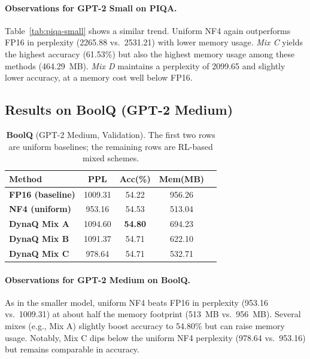 \documentclass{article}
\begin{document}
	\paragraph{Observations for GPT-2 Small on PIQA.}
	Table~\ref{tab:piqa-small} shows a similar trend. Uniform NF4 again outperforms FP16 in perplexity (2265.88 vs.\ 2531.21) with lower memory usage. \emph{Mix C} yields the highest accuracy (61.53\%) but also the highest memory usage among these methods (464.29~MB). \emph{Mix D} maintains a perplexity of 2099.65 and slightly lower accuracy, at a memory cost well below FP16.
	
	\subsection{Results on BoolQ (GPT-2 Medium)}
	\label{sec:boolq-medium}
	
	\begin{table}[ht]
		\centering
		\caption{\small \textbf{BoolQ} (GPT-2 Medium, Validation). The first two rows are uniform baselines; the remaining rows are RL-based mixed schemes.}
		\label{tab:boolq-medium}
		\begin{tabular}{lcccc}
			\toprule
			\textbf{Method} & \textbf{PPL} & \textbf{Acc(\%)} & \textbf{Mem(MB)} \\
			\midrule
			\textbf{FP16 (baseline)}  & 1009.31 & 54.22 & 956.26 \\
			\textbf{NF4 (uniform)}    & 953.16  & 54.53 & 513.04 \\
			\midrule
			\textbf{DynaQ Mix A}      & 1094.60 & \textbf{54.80} & 694.23 \\
			\textbf{DynaQ Mix B}      & 1091.37 & 54.71 & 622.10 \\
			\textbf{DynaQ Mix C}      & 978.64  & 54.71 & 532.71 \\
			\bottomrule
		\end{tabular}
		\vspace{-1em}
	\end{table}
	
	\paragraph{Observations for GPT-2 Medium on BoolQ.}
	As in the smaller model, uniform NF4 beats FP16 in perplexity (953.16 vs.\ 1009.31) at about half the memory footprint (513~MB vs.\ 956~MB). Several mixes (e.g., Mix A) slightly boost accuracy to 54.80\% but can raise memory usage. Notably, Mix C dips below the uniform NF4 perplexity (978.64 vs.\ 953.16) but remains comparable in accuracy.
	
\end{document}
